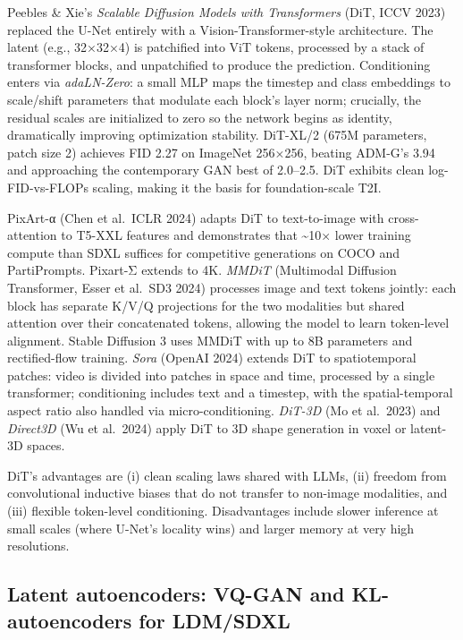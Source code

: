 Peebles \& Xie's \emph{Scalable Diffusion Models with Transformers} (DiT, ICCV 2023) replaced the U-Net entirely with a Vision-Transformer-style architecture. The latent (e.g., 32×32×4) is patchified into ViT tokens, processed by a stack of transformer blocks, and unpatchified to produce the prediction. Conditioning enters via \emph{adaLN-Zero}: a small MLP maps the timestep and class embeddings to scale/shift parameters that modulate each block's layer norm; crucially, the residual scales are initialized to zero so the network begins as identity, dramatically improving optimization stability. DiT-XL/2 (675M parameters, patch size 2) achieves FID 2.27 on ImageNet 256×256, beating ADM-G's 3.94 and approaching the contemporary GAN best of 2.0--2.5. DiT exhibits clean log-FID-vs-FLOPs scaling, making it the basis for foundation-scale T2I.

PixArt-α (Chen et al.~ICLR 2024) adapts DiT to text-to-image with cross-attention to T5-XXL features and demonstrates that \textasciitilde10× lower training compute than SDXL suffices for competitive generations on COCO and PartiPrompts. Pixart-Σ extends to 4K. \emph{MMDiT} (Multimodal Diffusion Transformer, Esser et al.~SD3 2024) processes image and text tokens jointly: each block has separate K/V/Q projections for the two modalities but shared attention over their concatenated tokens, allowing the model to learn token-level alignment. Stable Diffusion 3 uses MMDiT with up to 8B parameters and rectified-flow training. \emph{Sora} (OpenAI 2024) extends DiT to spatiotemporal patches: video is divided into patches in space and time, processed by a single transformer; conditioning includes text and a timestep, with the spatial-temporal aspect ratio also handled via micro-conditioning. \emph{DiT-3D} (Mo et al.~2023) and \emph{Direct3D} (Wu et al.~2024) apply DiT to 3D shape generation in voxel or latent-3D spaces.

DiT's advantages are (i) clean scaling laws shared with LLMs, (ii) freedom from convolutional inductive biases that do not transfer to non-image modalities, and (iii) flexible token-level conditioning. Disadvantages include slower inference at small scales (where U-Net's locality wins) and larger memory at very high resolutions.

\subsection{Latent autoencoders: VQ-GAN and KL-autoencoders for LDM/SDXL}\label{latent-autoencoders-vq-gan-and-kl-autoencoders-for-ldmsdxl}

